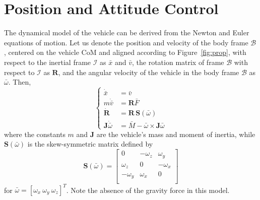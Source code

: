\documentclass{article}
\begin{document}
\section{Position and Attitude Control}
\label{sec:posit-attit-contr}

The dynamical model of the vehicle can be
derived from the Newton and Euler equations of motion. Let us denote the position and velocity of the
body frame $\mathcal{B}$, centered on the vehicle CoM and aligned
according to Figure~\ref{fig:prop}, with respect to the inertial frame
$\mathcal{I}$ as $\bar{x}$ and $\bar{v}$, the rotation matrix of frame
$\mathcal{B}$ with respect to $\mathcal{I}$ as $\mathbf{R}$, and the
angular velocity of the vehicle in the body frame $\mathcal{B}$ as
$\bar{\omega}$. Then,
\begin{equation}
  \label{eq:dynsys}
  \left\{
    \begin{aligned}
      \dot{\bar{x}} &= \bar{v} \\
      m \dot{\bar{v}} &= \mathbf{R} \bar{F} \\
      \dot{\mathbf{R}} &= \mathbf{R}\,\mathbf{S}(\bar{\omega}) \\
      \mathbf{J} \dot{\bar{\omega}} &= \bar{M} - \bar{\omega}\times\mathbf{J} \bar{\omega}
    \end{aligned}
  \right.
\end{equation}
where the constants $m$ and $\mathbf{J}$
are the vehicle's mass and moment of inertia, while
$\mathbf{S}(\bar{\omega})$ is the skew-symmetric matrix defined by
\begin{equation}
  \label{eq:S}
  \mathbf{S}(\bar{\omega}) =
  \left[
    \begin{array}{ccc}
      0 & -\omega_z & \omega_y \\
      \omega_z & 0 & -\omega_x \\
      -\omega_y & \omega_x & 0 \\
    \end{array}
  \right]
\end{equation}
for $\bar{\omega}=[\omega_x\:\omega_y\:\omega_z]^T$. Note the absence
of the gravity force in this model.
\end{document}
